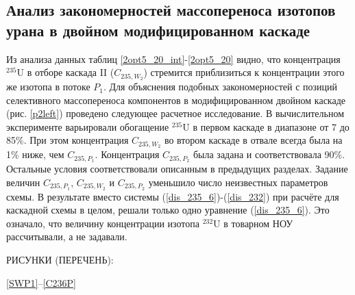 \begin{enumerate}
\end{enumerate}


\subsection{Анализ закономерностей массопереноса изотопов урана в двойном модифицированном каскаде}

Из анализа данных таблиц \ref*{2opt5_20_int}-\ref*{2opt5_20} видно, что концентрация $^{235}$U в отборе каскада II ($C_{235,{W_2}}$) стремится приблизиться к концентрации этого же изотопа в потоке $P_1$. Для объяснения подобных закономерностей с позиций селективного массопереноса компонентов в модифицированном двойном каскаде (рис. \ref{p2left}) проведено следующее расчетное исследование. В вычислительном эксперименте варьировали обогащение $^{235}$U в первом каскаде в диапазоне от 7 до 85\%. При этом концентрация $C_{235,{W_2}}$ во втором каскаде в отвале всегда была на 1\% ниже, чем $C_{235,{P_1}}$. Концентрация  $C_{235,{P_2}}$ была задана и соответствовала 90\%. Остальные условия соответствовали описанным в предыдущих разделах.  
Задание величин $C_{235,{P_1}}$, $C_{235,{W_2}}$ и $C_{235,{P_2}}$ уменьшило число неизвестных параметров схемы. В результате вместо системы (\ref{dis_235_6})-(\ref{dis_232}) при расчёте для каскадной схемы в целом, решали только одно уравнение (\ref{dis_235_6}). Это означало, что величину концентрации изотопа $^{232}$U в товарном НОУ рассчитывали, а не задавали.    

РИСУНКИ (ПЕРЕЧЕНЬ): 

\ref{SWP1}--\ref{C236P}


